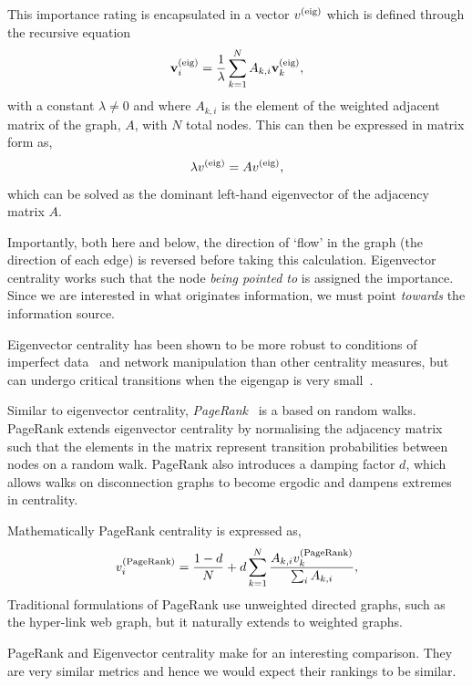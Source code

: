 This importance rating is encapsulated in a vector $v^{\rm(eig)}$ which is defined through the recursive equation
\begin{equation}\label{eq:eigenvector}
\textbf{v}_{i}^{\rm(eig)}=\frac{1}{\lambda} \sum_{k=1}^{N} A_{k, i} \textbf{v}_{k}^{\rm(eig)},
\end{equation}
with a constant $\lambda \neq 0$ and where $A_{k, i}$ is the element of the weighted adjacent matrix of the graph, $A$, with $N$ total nodes. This can then be expressed in matrix form as,
\begin{equation}
\lambda v^{\rm(eig)} = A v^{\rm(eig)}, 
\end{equation}
which can be solved as the dominant left-hand eigenvector of the adjacency matrix $A$. 

Importantly, both here and below, the direction of `flow' in the graph (the direction of each edge) is reversed before taking this calculation. Eigenvector centrality works such that the node \emph{being pointed to} is assigned the importance. Since we are interested in what originates information, we must point \emph{towards} the information source.

Eigenvector centrality has been shown to be more robust to conditions of imperfect data~\cite{costenbader_stability_2003} and network manipulation \cite{niu_robustness_2015} than other centrality measures, but can undergo critical transitions when the eigengap is very small~\cite{south_centrality_2021}.

Similar to eigenvector centrality, \emph{PageRank}~\cite{brin_anatomy_1998,page_pagerank_1999} is a based on random walks. PageRank extends eigenvector centrality by normalising the adjacency matrix such that the elements in the matrix represent transition probabilities between nodes on a random walk. PageRank also introduces a damping factor $d$, which allows walks on disconnection graphs to become ergodic and dampens extremes in centrality.

Mathematically PageRank centrality is expressed as,
\begin{equation}
	v_i^{\rm (PageRank)}=\frac{1-d}{N}+d \sum_{k =1 }^{N} \frac{ A_{k,i} v_k^{\rm (PageRank)}}{\sum_i A_{k,i}},
\end{equation}
Traditional formulations of PageRank use unweighted directed graphs, such as the hyper-link web graph, but it naturally extends to weighted graphs.

PageRank and Eigenvector centrality make for an interesting comparison. They are very similar metrics and hence we would expect their rankings to be similar. 

